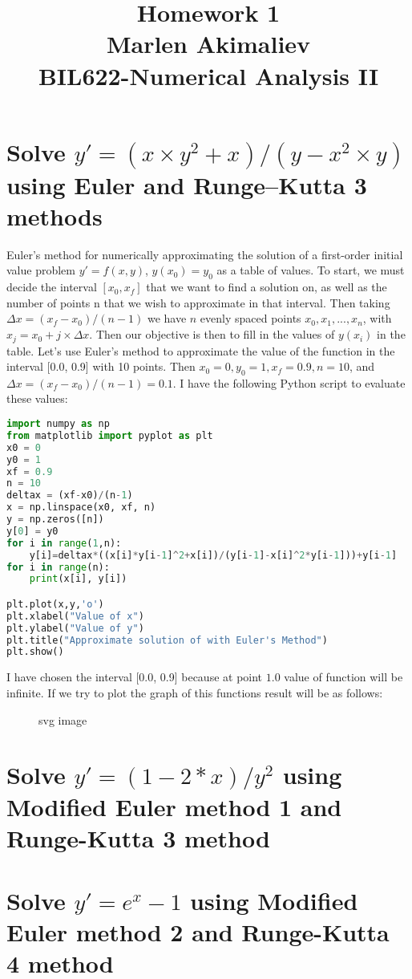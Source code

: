 \documentclass[a4paper,10pt]{article}
\date{\displaydate{date}}
\title{Homework 1\\Marlen Akimaliev\\BIL622-Numerical Analysis II}
\begin{document}
\maketitle

\section{Solve $y'=(x \times y^2+x)/(y-x^2 \times y)$ using Euler and Runge–Kutta 3 methods}
Euler’s method for numerically approximating the solution of a first-order initial value problem $y'=f(x,y)$, $y(x_0) = y_0$ as a table of values. To start, we must decide the interval $[x_0 ,x_f]$ that we want to find a solution on, as well as the number of points n that we wish to approximate in that interval. Then taking $\Delta x = (x_f-x_0)/(n-1)$ we have $n$ evenly spaced points $x_0, x_1,..., x_n$, with $x_j = x_0+j\times \Delta x$. Then our objective is then to fill in the values of $y(x_i)$ in the table. Let’s use Euler’s method to approximate the value of the function in the interval [0.0, 0.9] with 10 points. Then $x_0 = 0, y_0 = 1, x_f = 0.9, n = 10$, and $\Delta x = (x_f-x_0 )/(n-1)=0.1$. I have the following Python script to evaluate these values:
\begin{lstlisting}[language=Python]
import numpy as np
from matplotlib import pyplot as plt
x0 = 0
y0 = 1
xf = 0.9
n = 10
deltax = (xf-x0)/(n-1)
x = np.linspace(x0, xf, n)
y = np.zeros([n])
y[0] = y0
for i in range(1,n):
    y[i]=deltax*((x[i]*y[i-1]^2+x[i])/(y[i-1]-x[i]^2*y[i-1]))+y[i-1]
for i in range(n):
    print(x[i], y[i])

plt.plot(x,y,'o')
plt.xlabel("Value of x")
plt.ylabel("Value of y")
plt.title("Approximate solution of with Euler's Method")
plt.show()
\end{lstlisting}
I have chosen the interval [0.0, 0.9] because at point $1.0$ value of function will be infinite. If we try to plot the graph of this functions result will be as follows:
\begin{figure}[htbp]
  \centering
  
  \caption{svg image}
\end{figure}

\section{Solve $y'=(1-2*x)/y^2$ using Modified Euler method 1 and Runge-Kutta 3 method}
\section{Solve $y'=e^{x}-1$ using Modified Euler method 2 and Runge-Kutta 4 method}
\end{document}
